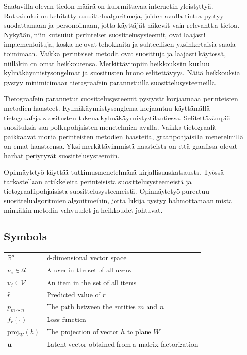 \documentclass[english, 12pt, a4paper, sci, utf8, a-2b, online]{aaltothesis}
\begin{document}
\begin{abstractpage}[finnish]
Saatavilla olevan tiedon määrä on kuormittavaa internetin yleistyttyä. Ratkaisuksi on kehitetty suosittelualgoritmeja, joiden avulla tietoa pystyy suodattamaan ja personoimaan, jotta käyttäjät näkevät vain relevanttia tietoa. Nykyään, niin kutsutut perinteiset suosittelusysteemit, ovat laajasti implementoituja, koska ne ovat tehokkaita ja suhteellisen yksinkertaisia saada toimimaan. Vaikka perinteiset metodit ovat suosittuja ja laajasti käytössä, niilläkin on omat heikkoutensa. Merkittävimpiin heikkouksiin kuuluu kylmäkäynnistysongelmat ja suositusten huono selitettävyys. Näitä heikkouksia pystyy minimioimaan tietograafein parannetuilla suosittelusysteemeillä.

Tietograafein parannetut suosittelusysteemit pystyvät korjaamaan perinteisten metodien haasteet. Kylmäkäynnistysonglema korjaantuu käyttämällä tietograafeja suositusten tukena kylmäkäynnistystilantiessa. Selitettävämpiä suosituksia saa polkupohjaisten menetelmien avulla. Vaikka tietograafit paikkaavat monia perinteisten metodien haasteita, graafipohjaisilla menetelmillä on omat haasteensa. Yksi merkittävimmistä haasteista on että graafissa olevat harhat periytyvät suosittelusysteemiin. 

Opinnäytetyö käyttää tutkimusmenetelmänä kirjallisuuskatsausta. Työssä tarkastellaan artikkeleita perinteisistä suosittelusysteemeistä ja tietograaffipohjaisista suosittelusysteemeistä. Opinnäytetyö pureutuu suosittelualgoritmien algoritmeihin, jotta lukija pystyy hahmottamaan mistä minkäkin metodin vahvuudet ja heikkoudet johtuvat.
\end{abstractpage}

\newpage

\dothesispagenumbering{}

\thesistableofcontents


\subsection*{Symbols}
\begin{tabular}{ll}
$\mathbb{R}^d$              & d-dimensional vector space \\
$u_i \in \mathcal{U}$       & A user in the set of all users \\
$v_j \in \mathcal{V}$       & An item in the set of all items \\
$\hat{r}$                   & Predicted value of $r$ \\
$p_{m\leadsto n}$           & The path between the entities $m$ and $n$ \\
$f_r(\cdot)$                & Loss function \\
$\text{proj}_W(h)$          & The projection of vector $h$ to plane $W$ \\
$\textbf{u}$                & Latent vector obtained from a matrix factorization \\
\end{tabular}
\end{document}

